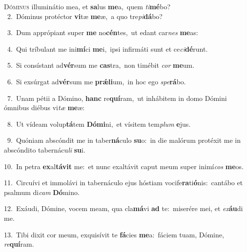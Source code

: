 \lettrine{\initial\textcolor{\initialcolor}{D}}{óminus} illuminátio mea, et \textbf{sa}\-lus \textbf{me}\-a,~\star quem \textit{ti}\-\textbf{mé}bo?\\
{\numbfont\textcolor{\numbcolor}{~2.}}~Dóminus protéctor \textbf{vi}\-tæ \textbf{me}\-æ,~\star a quo tre\-\textit{pi}\-\textbf{dá}bo?\par
{\numbfont\textcolor{\numbcolor}{~3.}}~Dum apprópiant super \textbf{me} no\-\textbf{cén}\-tes,~\star ut edant car\textit{nes} \textbf{me}\-as:\par
{\numbfont\textcolor{\numbcolor}{~4.}}~Qui tríbulant me ini\-\textbf{mí}\-ci \textbf{me}\-i,~\star ipsi infirmáti sunt et ce\-\textit{ci}\-\textbf{dé}runt.\par
{\numbfont\textcolor{\numbcolor}{~5.}}~Si consístant ad\-\textbf{vér}\-sum me \textbf{cas}\-tra,~\star non timébit \textit{cor} \textbf{me}\-um.\par
{\numbfont\textcolor{\numbcolor}{~6.}}~Si exsúrgat ad\-\textbf{vér}\-sum me \textbf{prǽ}\-\textbf{li}um,~\star in hoc ego \textit{spe}\-\textbf{rá}bo.\par
{\numbfont\textcolor{\numbcolor}{~7.}}~Unam pétii a Dómino, \textbf{hanc} re\-\textbf{quí}\-ram,~\star ut inhábitem in domo Dómini ómnibus diébus vi\textit{tæ} \textbf{me}\-æ:\par
{\numbfont\textcolor{\numbcolor}{~8.}}~Ut vídeam volup\-\textbf{tá}\-tem \textbf{Dó}\-\textbf{mi}ni,~\star et vísitem tem\textit{plum} \textbf{e}\-jus.\par
{\numbfont\textcolor{\numbcolor}{~9.}}~Quóniam abscóndit me in taber\-\textbf{ná}\-culo \textbf{su}\-o:~\star in die malórum protéxit me in abscóndito tabernácu\textit{li} \textbf{su}\-i.\par
{\numbfont\textcolor{\numbcolor}{10.}}~In petra \textbf{ex}\-al\-\textbf{tá}\-\textbf{vit} me:~\star et nunc exaltávit caput meum super inimí\textit{cos} \textbf{me}\-os.\par
{\numbfont\textcolor{\numbcolor}{11.}}~Circuívi et immolávi in tabernáculo ejus hóstiam vocife\-\textbf{ra}\-ti\-\textbf{ó}\-nis:~\star cantábo et psalmum di\textit{cam} \textbf{Dó}\-mino.\par
{\numbfont\textcolor{\numbcolor}{12.}}~Exáudi, Dómine, vocem meam, qua cla\-\textbf{má}\-vi \textbf{ad} te:~\star miserére mei, et \textit{ex}\-\textbf{áu}di me.\par
{\numbfont\textcolor{\numbcolor}{13.}}~Tibi dixit cor meum, exquisívit te \textbf{fá}\-cies \textbf{me}\-a:~\star fáciem tuam, Dómine, \textit{re}\-\textbf{quí}ram.\par
